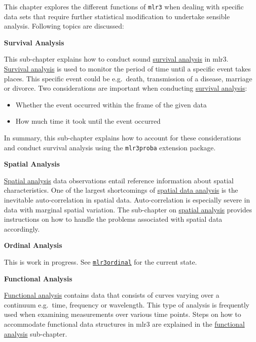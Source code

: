 \documentclass[]{article}
\providecommand{\tightlist}{%
  \setlength{\itemsep}{0pt}\setlength{\parskip}{0pt}}
\begin{document}
This chapter explores the different functions of \texttt{mlr3} when dealing with specific data sets that require further statistical modification to undertake sensible analysis.
Following topics are discussed:

\textbf{Survival Analysis}

This sub-chapter explains how to conduct sound \protect\hyperlink{survival}{survival analysis} in mlr3.
\protect\hyperlink{survival}{Survival analysis} is used to monitor the period of time until a specific event takes places.
This specific event could be e.g.~death, transmission of a disease, marriage or divorce.
Two considerations are important when conducting \protect\hyperlink{survival}{survival analysis}:

\begin{itemize}
\tightlist
\item
  Whether the event occurred within the frame of the given data
\item
  How much time it took until the event occurred
\end{itemize}

In summary, this sub-chapter explains how to account for these considerations and conduct survival analysis using the \texttt{mlr3proba} extension package.

\textbf{Spatial Analysis}

\protect\hyperlink{spatial}{Spatial analysis} data observations entail reference information about spatial characteristics.
One of the largest shortcomings of \protect\hyperlink{spatial}{spatial data analysis} is the inevitable auto-correlation in spatial data.
Auto-correlation is especially severe in data with marginal spatial variation.
The sub-chapter on \protect\hyperlink{spatial}{spatial analysis} provides instructions on how to handle the problems associated with spatial data accordingly.

\textbf{Ordinal Analysis}

This is work in progress.
See \href{https://github.com/mlr-org/mlr3ordinal}{\texttt{mlr3ordinal}} for the current state.

\textbf{Functional Analysis}

\protect\hyperlink{functional}{Functional analysis} contains data that consists of curves varying over a continuum e.g.~time, frequency or wavelength.
This type of analysis is frequently used when examining measurements over various time points.
Steps on how to accommodate functional data structures in mlr3 are explained in the \protect\hyperlink{functional}{functional analysis} sub-chapter.
\end{document}
